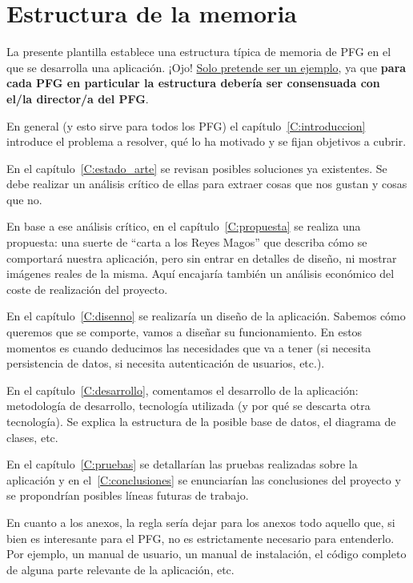 \documentclass[../main.tex]{subfiles}
\begin{document}
\section{Estructura de la memoria}

La presente plantilla establece una estructura típica de memoria de PFG en el que se desarrolla una aplicación. ¡Ojo! \underline{Solo pretende ser un ejemplo}, ya que \textbf{para cada PFG en particular la estructura debería ser consensuada con el/la director/a del PFG}.

En general (y esto sirve para todos los PFG) el capítulo~\ref{C:introduccion} introduce el problema a resolver, qué lo ha motivado y se fijan objetivos a cubrir.

En el capítulo~\ref{C:estado_arte} se revisan posibles soluciones ya existentes. Se debe realizar un análisis crítico de ellas para extraer cosas que nos gustan y cosas que no.

En base a ese análisis crítico, en el capítulo~\ref{C:propuesta} se realiza una propuesta: una suerte de ``carta a los Reyes Magos'' que describa cómo se comportará nuestra aplicación, pero sin entrar en detalles de diseño, ni mostrar imágenes reales de la misma. Aquí encajaría también un análisis económico del coste de realización del proyecto.

En el capítulo~\ref{C:disenno} se realizaría un diseño de la aplicación. Sabemos cómo queremos que se comporte, vamos a diseñar su funcionamiento. En estos momentos es cuando deducimos las necesidades que va a tener (si necesita persistencia de datos, si necesita autenticación de usuarios, etc.).

En el capítulo~\ref{C:desarrollo}, comentamos el desarrollo de la aplicación: metodología de desarrollo, tecnología utilizada (y por qué se descarta otra tecnología). Se explica la estructura de la posible base de datos, el diagrama de clases, etc.

En el capítulo~\ref{C:pruebas} se detallarían las pruebas realizadas sobre la aplicación y en el~\ref{C:conclusiones} se enunciarían las conclusiones del proyecto y se propondrían posibles líneas futuras de trabajo.

En cuanto a los anexos, la regla sería dejar para los anexos todo aquello que, si bien es interesante para el PFG, no es estrictamente necesario para entenderlo. Por ejemplo, un manual de usuario, un manual de instalación, el código completo de alguna parte relevante de la aplicación, etc.
\end{document}
